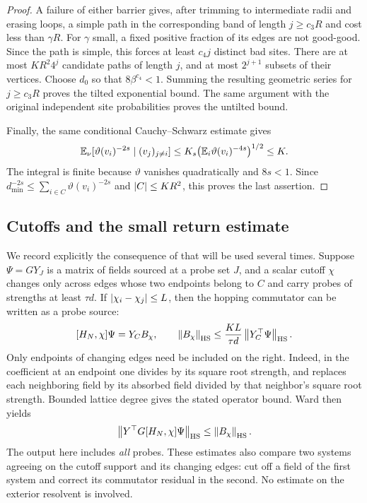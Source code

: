 \begin{proof}
A failure of either barrier gives, after trimming to intermediate
radii and erasing loops, a simple path in the corresponding band of
length \(j\ge c_3R\) and cost less than \(\gamma R\). For \(\gamma\)
small, a fixed positive fraction of its edges are not good-good.
Since the path is simple, this forces at least \(c_4j\) distinct bad
sites. There are at most \(K R^2 4^j\) candidate paths of length \(j\),
and at most \(2^{j+1}\) subsets of their vertices. Choose \(d_0\) so
that \(8\beta^{c_4}<1\). Summing the resulting geometric series for
\(j\ge c_3R\) proves the tilted exponential bound. The same argument
with the original independent site probabilities proves the untilted
bound.

Finally, the same conditional Cauchy--Schwarz estimate gives
\[
 \mathbb E_\nu[\vartheta(v_i)^{-2s}\mid(v_j)_{j\ne i}]
       \le K_s\bigl(\mathbb E_i\vartheta(v_i)^{-4s}\bigr)^{1/2}\le K.
\]
The integral is finite because \(\vartheta\) vanishes quadratically and
\(8s<1\). Since
\(d_{\min}^{-2s}\le\sum_{i\in C}\vartheta(v_i)^{-2s}\) and
\(\left\lvert C\right\rvert\le K R^2\), this proves the last assertion.
\end{proof}

\subsection{Cutoffs and the small return estimate}

We record explicitly the consequence of  that will be
used several times. Suppose \(\Psi=GY_J\) is a matrix of fields sourced
at a probe set \(J\), and a scalar cutoff \(\chi\) changes only across
edges whose two endpoints belong to \(C\) and carry probes of strengths
at least \(\tau d\). If \(\left\lvert\chi_i-\chi_j\right\rvert\le L\), then the hopping
commutator can be written as a probe source:
\begin{equation}\label{boot:commutator}
 [H_N,\chi]\Psi=Y_C B_\chi,
 \qquad
 \left\lVert B_\chi\right\rVert_{\rm HS}
       \le\frac{K L}{\tau d}
           \left\lVert Y_C^\top\Psi\right\rVert_{\rm HS}.
\end{equation}
Only endpoints of changing edges need be included on the right.
Indeed, in the coefficient at an endpoint one divides by its square
root strength, and replaces each neighboring field by its absorbed
field divided by that neighbor's square root strength. Bounded lattice
degree gives the stated operator bound. Ward then yields
\begin{equation}\label{boot:cutoff-ward}
 \left\lVert Y^\top G[H_N,\chi]\Psi\right\rVert_{\rm HS}
             \le\left\lVert B_\chi\right\rVert_{\rm HS}.
\end{equation}
The output here includes \emph{all} probes. These estimates also compare
two systems agreeing on the cutoff support and its changing edges:
cut off a field of the first system and correct its commutator residual
in the second. No estimate on the exterior resolvent is involved.

